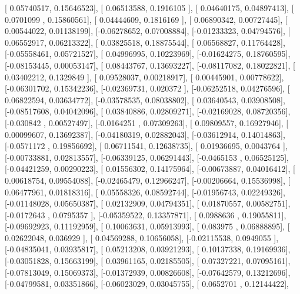 \documentclass{article}
\begin{document}
       [ 0.05740517,  0.15646523],
       [ 0.06513588,  0.1916105 ],
       [ 0.04640175,  0.04897413],
       [ 0.0701099 ,  0.15860561],
       [ 0.04444609,  0.1816169 ],
       [ 0.06890342,  0.00727445],
       [ 0.00544022,  0.01138199],
       [-0.06278652,  0.07008884],
       [-0.01233323,  0.04794576],
       [ 0.06552917,  0.06213322],
       [ 0.03825518,  0.18875544],
       [ 0.06568827,  0.11764428],
       [-0.05558461,  0.05721527],
       [ 0.04996995,  0.10223969],
       [-0.01624275,  0.18760595],
       [-0.08153445,  0.00053147],
       [ 0.08443767,  0.13693227],
       [-0.08117082,  0.18022821],
       [ 0.03402212,  0.1329849 ],
       [ 0.09528037,  0.00218917],
       [ 0.00445901,  0.00778622],
       [-0.06301702,  0.15342236],
       [-0.02369731,  0.020372  ],
       [-0.06252518,  0.04276596],
       [ 0.06822594,  0.03634772],
       [-0.03578535,  0.08038802],
       [ 0.03640543,  0.03908508],
       [-0.08517608,  0.04042096],
       [ 0.03840886,  0.02809271],
       [-0.02169028,  0.08720356],
       [-0.030842  ,  0.00527497],
       [-0.0164251 ,  0.07309263],
       [ 0.09809557,  0.16927946],
       [ 0.00099607,  0.13692387],
       [-0.04180319,  0.02882043],
       [-0.03612914,  0.14014863],
       [-0.0571172 ,  0.19856692],
       [ 0.06711541,  0.12638735],
       [ 0.01936695,  0.0043764 ],
       [-0.00733881,  0.02813557],
       [-0.06339125,  0.06291443],
       [-0.0465153 ,  0.06525125],
       [-0.04421259,  0.00290223],
       [ 0.01556302,  0.14175964],
       [-0.00673887,  0.04016412],
       [ 0.00618754,  0.09554088],
       [-0.02465479,  0.12966247],
       [-0.00206664,  0.15536998],
       [ 0.06477961,  0.01818316],
       [ 0.05558326,  0.08592744],
       [-0.01956743,  0.02249326],
       [-0.01148028,  0.05650387],
       [ 0.02132909,  0.04794351],
       [ 0.01870557,  0.00582751],
       [-0.0172643 ,  0.0795357 ],
       [-0.05359522,  0.13357871],
       [ 0.0988636 ,  0.19055811],
       [-0.09692923,  0.11192959],
       [ 0.10063631,  0.05913993],
       [ 0.083975  ,  0.06888895],
       [ 0.02622048,  0.036929  ],
       [ 0.04569288,  0.10656058],
       [-0.02115538,  0.0949055 ],
       [-0.04835041,  0.03935817],
       [ 0.05213208,  0.03921293],
       [ 0.10137338,  0.19169936],
       [-0.03051828,  0.15663199],
       [ 0.03961165,  0.02185505],
       [ 0.07327221,  0.07095161],
       [-0.07813049,  0.15069373],
       [-0.01372939,  0.00826608],
       [-0.07642579,  0.13212696],
       [-0.04799581,  0.03351866],
       [-0.06023029,  0.03045755],
       [ 0.0652701 ,  0.12144422],
\end{document}
